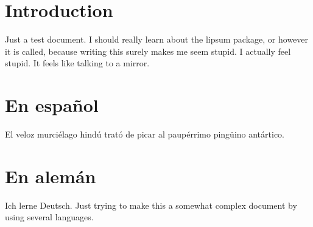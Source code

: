 \documentclass{article}
\begin{document}
	\section{Introduction}
	Just a test document. I should really learn about the lipsum package, or however it is called, because writing this surely makes me seem stupid. I actually feel stupid. It feels like talking to a mirror.
	
	\section{\textspanish{En español}}
	\textspanish{El veloz murciélago hindú trató de picar al paupérrimo pingüino antártico.}
	
	\section{\textspanish{En \mbox{alemán}}}
	\textgerman{Ich lerne \mbox{Deutsch}.} Just trying to make this a somewhat complex document by using several languages.
\end{document}
